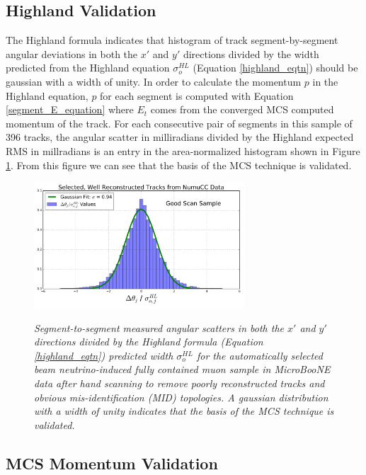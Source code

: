 \documentclass[a4paper,11pt]{article}
\begin{document}
\subsection{Highland Validation}\label{highland_validation_section}
The Highland formula indicates that histogram of track segment-by-segment angular deviations in both the $x'$ and $y'$ directions divided by the width predicted from the Highland equation $\sigma_o^{HL}$ (Equation \ref{highland_eqtn}) should be gaussian with a width of unity. In order to calculate the momentum $p$ in the Highland equation, $p$ for each segment is computed with Equation \ref{segment_E_equation} where $E_t$ comes from the converged MCS computed momentum of the track. For each consecutive pair of segments in this sample of 396 tracks, the angular scatter in milliradians divided by the Highland expected RMS in millradians is an entry in the area-normalized histogram shown in Figure \ref{Highland_validation_fig}. From this figure we can see that the basis of the MCS technique is validated.

\begin{figure}[ht!]
\centering
	\includegraphics[width=0.7\textwidth]{Figures/Highland_validation_DataBNBSelectedRecoTrack_goodscan.png} \\
\caption{\textit{Segment-to-segment measured angular scatters in both the $x'$ and $y'$ directions divided by the Highland formula (Equation \ref{highland_eqtn}) predicted width $\sigma_o^{HL}$ for the automatically selected beam neutrino-induced fully contained muon sample in MicroBooNE data after hand scanning to remove poorly reconstructed tracks and obvious mis-identification (MID) topologies. A gaussian distribution with a width of unity indicates that the basis of the MCS technique is validated.}}\label{Highland_validation_fig}
\end{figure}


\subsection{MCS Momentum Validation}\label{MCS_Momentum_Validation_DataRecoTrack_section}
\end{document}
